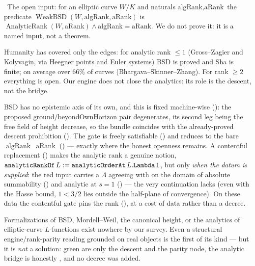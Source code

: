 \begin{definition}\label{def:WeakBSD}
\red{}\ The open input: for an elliptic curve $W/K$ and naturals $\text{algRank},\text{aRank}$ the
predicate $\operatorname{WeakBSD}(W,\text{algRank},\text{aRank})$ is
$\operatorname{AnalyticRank}(W,\text{aRank})\wedge\text{algRank}=\text{aRank}$. We do not prove it:
it is a named input, not a theorem. 
\end{definition}

Humanity has covered only the edges: for analytic rank $\le 1$ (Gross–Zagier and Kolyvagin, via
Heegner points and Euler systems) BSD is proved and Sha is finite; on average over $66\%$ of
curves (Bhargava–Skinner–Zhang). For rank $\ge 2$ everything is open. Our engine does not close the
analytics: its role is the descent, not the bridge.

BSD has no epistemic axis of its own, and this is fixed machine-wise
(): the proposed ground/beyondOwnHorizon pair degenerates, its second
leg being the free field of height decrease, so the bundle coincides with the already-proved descent
prohibition (). The  gate is freely
satisfiable () and  reduces to the bare
$\text{algRank}=\text{aRank}$ () --- exactly where the
honest \red{} openness remains. A contentful replacement ()
makes the analytic rank a genuine notion, $\texttt{analyticRankOf}\,L:=\texttt{analyticOrderAt}\,
L.\texttt{Lambda}\,1$, but only \emph{when the datum is supplied}: the red input
 carries a $\Lambda$ agreeing with  on the
domain of absolute summability () and analytic at $s=1$ () ---
the very continuation  lacks (even with the Hasse bound, $1<3/2$ lies outside the
half-plane of convergence). On these data the contentful gate  pins the rank
(), at a cost of data rather than a decree.

Formalizations of BSD, Mordell–Weil, the canonical height, or the analytics of elliptic-curve
$L$-functions exist nowhere by our survey. Even a structural engine/rank-parity reading grounded on
real  objects is the first of its kind --- but it is \emph{not} a solution: green are
only the descent and the parity node, the analytic bridge is honestly \red{}, and no decree was
added.

